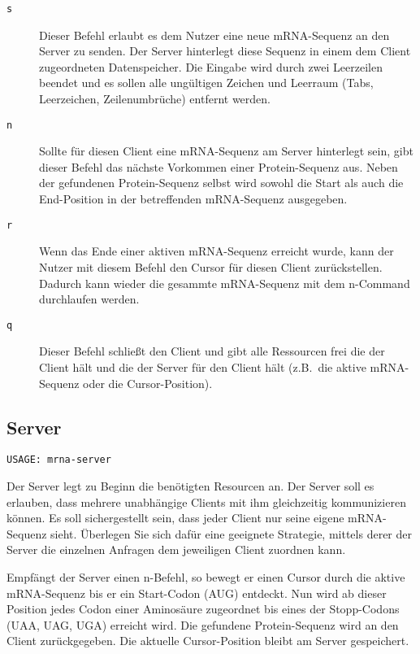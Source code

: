 \begin{description}

  \item[\texttt{s}] Dieser Befehl erlaubt es dem Nutzer eine neue mRNA-Sequenz
    an den Server zu senden. Der Server hinterlegt diese Sequenz in einem dem
    Client zugeordneten Datenspeicher. Die Eingabe wird durch zwei Leerzeilen
    beendet und es sollen alle ungültigen Zeichen und Leerraum (Tabs,
    Leerzeichen, Zeilenumbrüche) entfernt werden.

  \item[\texttt{n}] Sollte für diesen Client eine mRNA-Sequenz am Server
    hinterlegt sein, gibt dieser Befehl das nächste Vorkommen einer
    Protein-Sequenz aus. Neben der gefundenen Protein-Sequenz selbst wird
    sowohl die Start als auch die End-Position in der betreffenden mRNA-Sequenz
    ausgegeben.

  \item[\texttt{r}] Wenn das Ende einer aktiven mRNA-Sequenz erreicht wurde,
    kann der Nutzer mit diesem Befehl den Cursor für diesen Client
    zurückstellen. Dadurch kann wieder die gesammte mRNA-Sequenz mit dem
    n-Command durchlaufen werden.

  \item[\texttt{q}] Dieser Befehl schließt den Client und gibt alle Ressourcen
    frei die der Client hält und die der Server für den Client hält
    (z.B.\ die aktive mRNA-Sequenz oder die Cursor-Position).

\end{description}


\subsection*{Server}

\begin{verbatim}
USAGE: mrna-server
\end{verbatim}

Der Server legt zu Beginn die benötigten Resourcen an.
Der Server soll es erlauben, dass mehrere unabhängige Clients mit ihm
gleichzeitig kommunizieren können. Es soll sichergestellt sein, dass jeder
Client nur seine eigene mRNA-Sequenz sieht. Überlegen Sie sich dafür eine
geeignete Strategie, mittels derer der Server die einzelnen Anfragen dem
jeweiligen Client zuordnen kann.

Empfängt der Server einen n-Befehl, so bewegt er einen Cursor durch die aktive
mRNA-Sequenz bis er ein Start-Codon (AUG) entdeckt. Nun wird ab dieser
Position jedes Codon einer Aminosäure zugeordnet bis eines der Stopp-Codons
(UAA, UAG, UGA) erreicht wird. Die gefundene Protein-Sequenz wird an den
Client zurückgegeben. Die aktuelle Cursor-Position bleibt am Server
gespeichert.

